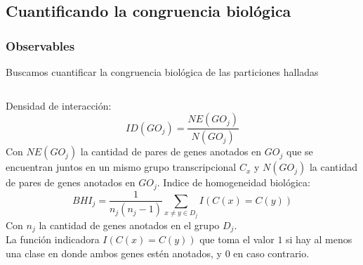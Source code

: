 \documentclass[serif,9pt, t]{beamer}
\begin{document}
\subsection{Cuantificando la congruencia biológica}
\begin{frame}\frametitle{Observables} 
\centering
Buscamos cuantificar la congruencia biológica de las particiones halladas
\bigskip
\begin{columns}[T]
	Densidad de interacción:\\
	\bigskip
	\begin{equation}
		ID(GO_j) = \frac{NE(GO_j)}{N(GO_j)}
	\end{equation}
	\bigskip
	Con $NE(GO_j)$ la cantidad de pares de genes anotados en $GO_j$ que se encuentran juntos en un mismo grupo 	transcripcional $C_x$ y $N(GO_j)$ la cantidad de pares de genes anotados en $GO_j$.
	Indice de homogeneidad biológica:\\
	\bigskip
	\begin{equation}
		BHI_j = \frac{1}{n_j(n_j-1)}\sum\limits_{x\neq y\in D_j}I(C(x)=C(y))
	\end{equation}
	\bigskip	
	Con $n_j$ la cantidad de genes anotados en el grupo $D_j$.\\
	La función indicadora $I(C(x)=C(y))$ que toma el valor $1$ si hay al menos una clase en donde ambos genes estén anotados, y $0$ en caso contrario.
\end{columns}
\end{frame}
\end{document}
